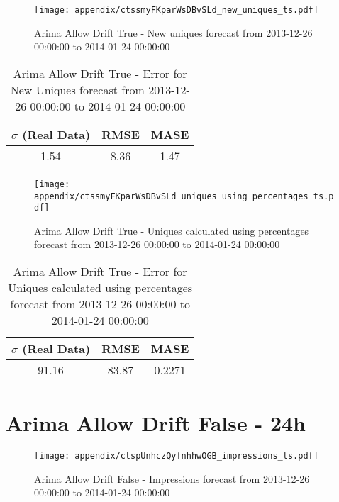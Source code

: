 \begin{figure}[H] \begin{center} \leavevmode
\texttt{[image: appendix/ctssmyFKparWsDBvSLd\_new\_uniques\_ts.pdf]} \caption[]{
Arima Allow Drift True - New uniques forecast from 2013-12-26 00:00:00 to 2014-01-24 00:00:00} \label{fig:appendix/ctssmyFKparWsDBvSLd_new_uniques_ts.pdf} \end{center}
\end{figure}

\begin{table}[H]
\centering
\footnotesize
\begin{tabular}{ccc}
$\sigma$ (Real Data) & RMSE & MASE   \\ \hline
1.54 & 8.36 & 1.47 \\
\end{tabular}

\vspace{0.5cm}

\caption[]{
Arima Allow Drift True - Error for New Uniques forecast from 2013-12-26 00:00:00 to 2014-01-24 00:00:00}
\end{table}

\begin{figure}[H] \begin{center} \leavevmode
\texttt{[image: appendix/ctssmyFKparWsDBvSLd\_uniques\_using\_percentages\_ts.pdf]} \caption[]{
Arima Allow Drift True - Uniques calculated using percentages forecast from 2013-12-26 00:00:00 to 2014-01-24 00:00:00} \label{fig:appendix/ctssmyFKparWsDBvSLd_uniques_using_percentages_ts.pdf} \end{center}
\end{figure}

\begin{table}[H]
\centering
\footnotesize
\begin{tabular}{ccc}
$\sigma$ (Real Data) & RMSE & MASE   \\ \hline
91.16 & 83.87 & 0.2271 \\
\end{tabular}

\vspace{0.5cm}

\caption[]{
Arima Allow Drift True - Error for Uniques calculated using percentages forecast from 2013-12-26 00:00:00 to 2014-01-24 00:00:00}
\end{table}

\section{Arima Allow Drift False - 24h}
\begin{figure}[H] \begin{center} \leavevmode
\texttt{[image: appendix/ctspUnhczQyfnhhwOGB\_impressions\_ts.pdf]} \caption[]{
Arima Allow Drift False - Impressions forecast from 2013-12-26 00:00:00 to 2014-01-24 00:00:00} \label{fig:appendix/ctspUnhczQyfnhhwOGB_impressions_ts.pdf} \end{center}
\end{figure}

